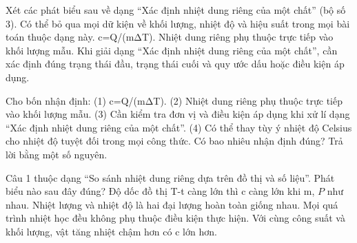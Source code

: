 \begin{ex}
Xét các phát biểu sau về dạng “Xác định nhiệt dung riêng của một chất” (bộ số 3).
\choiceTF
{Có thể bỏ qua mọi dữ kiện về khối lượng, nhiệt độ và hiệu suất trong mọi bài toán thuộc dạng này.}
{\True c=Q/(mΔT).}
{Nhiệt dung riêng phụ thuộc trực tiếp vào khối lượng mẫu.}
{\True Khi giải dạng “Xác định nhiệt dung riêng của một chất”, cần xác định đúng trạng thái đầu, trạng thái cuối và quy ước dấu hoặc điều kiện áp dụng.}
\end{ex}

\begin{ex}
Cho bốn nhận định: (1) c=Q/(mΔT). (2) Nhiệt dung riêng phụ thuộc trực tiếp vào khối lượng mẫu. (3) Cần kiểm tra đơn vị và điều kiện áp dụng khi xử lí dạng “Xác định nhiệt dung riêng của một chất”. (4) Có thể thay tùy ý nhiệt độ Celsius cho nhiệt độ tuyệt đối trong mọi công thức. Có bao nhiêu nhận định đúng? Trả lời bằng một số nguyên.
\end{ex}

\begin{ex}
Câu 1 thuộc dạng “So sánh nhiệt dung riêng dựa trên đồ thị và số liệu”. Phát biểu nào sau đây đúng?
\choice
{Độ dốc đồ thị T-t càng lớn thì c càng lớn khi m, $P$ như nhau.}
{Nhiệt lượng và nhiệt độ là hai đại lượng hoàn toàn giống nhau.}
{Mọi quá trình nhiệt học đều không phụ thuộc điều kiện thực hiện.}
{\True Với cùng công suất và khối lượng, vật tăng nhiệt chậm hơn có c lớn hơn.}
\end{ex}

